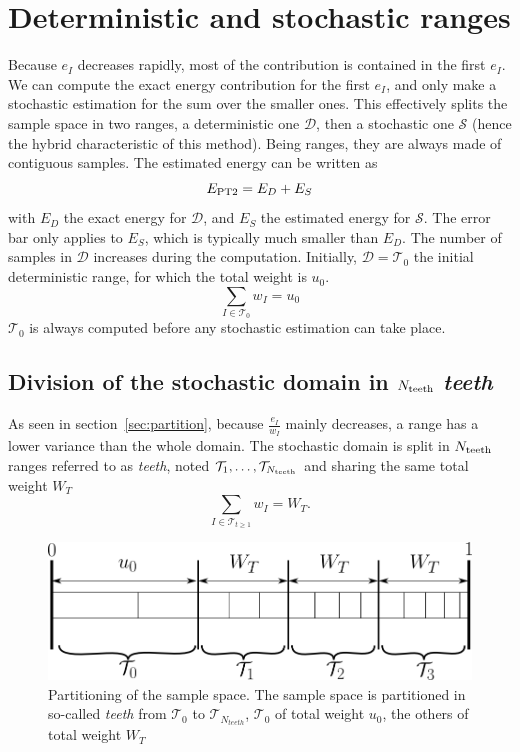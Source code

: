 \documentclass[./thesis.tex]{subfiles}
\begin{document}
\section{Deterministic and stochastic ranges}
Because $e_I$ decreases rapidly, most of the contribution is contained in the first $e_I$. We can compute the exact energy contribution for the first $e_I$, and only make a stochastic estimation for the sum over the smaller ones. This effectively splits the sample space in two ranges, a deterministic one $\mathcal{D}$, then a stochastic one $\mathcal{S}$ (hence the hybrid characteristic of this method). Being ranges, they are always made of contiguous samples. The estimated energy can be written as
\begin{equation}
E_\text{PT2} = E_D + E_S
\end{equation}
with $E_D$ the exact energy for $\mathcal{D}$, and $E_S$ the estimated energy for $\mathcal{S}$. The error bar only applies to $E_S$, which is typically much smaller than $E_D$.
The number of samples in $\mathcal{D}$ increases during the computation. Initially, $\mathcal{D}=\mathcal{T}_0$ the initial deterministic range, for which the total weight is $u_0$.
\begin{equation}
\sum_{I \in \mathcal{T}_0} w_I=u_0
\end{equation}
$\mathcal{T}_0$ is always computed before any stochastic estimation can take place.

\subsection{Division of the stochastic domain in $N_\text{teeth}$ \emph{teeth}}

As seen in section~\ref{sec:partition}, because $\frac{e_I}{w_I}$ mainly decreases, a range has a lower variance than the whole domain. The stochastic domain is split in $N_\text{teeth}$ ranges referred to as \emph{teeth}, noted $\mathcal{T}_1,\ldots,\mathcal{T}_{N_\text{teeth}}$ and sharing the same total weight $W_T$
\begin{equation}
\sum_{I \in \mathcal{T}_{t \geq 1}} w_I=W_T.
\end{equation}

 \begin{figure}[h!]
	\begin{center}
	\includegraphics[width=0.8\columnwidth]{figures/pt2/teeth}
	\end{center}
	\caption{Partitioning of the sample space.
		The sample space is partitioned in so-called \emph{teeth} from $\mathcal{T}_0$ to $\mathcal{T}_{N_{teeth}}$, $\mathcal{T}_0$ of total weight $u_0$, the others of total weight $W_T$}
	\label{fig:teeth}
\end{figure}
\end{document}

